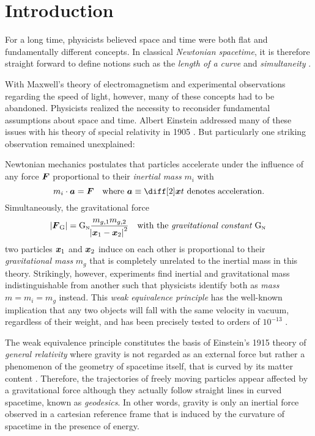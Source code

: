 \chapter{Introduction}\label{ch:intro}

For a long time, physicists believed space and time were both flat and fundamentally different concepts. In classical \emph{Newtonian spacetime}, it is therefore straight forward to define notions such as the \emph{length of a curve} and \emph{simultaneity} \autocite{Tolish}.

With Maxwell's theory of electromagnetism and experimental observations regarding the speed of light, however, many of these concepts had to be abandoned. Physicists realized the necessity to reconsider fundamental assumptions about space and time. Albert Einstein addressed many of these issues with his theory of special relativity in 1905 \autocite{Einstein1905}. But particularly one striking observation remained unexplained:

Newtonian mechanics postulates that particles accelerate under the influence of any force \(\boldsymbol{F}\) proportional to their \emph{inertial mass} \(m_i\) with \autocite{Newton1686}
\begin{equation}
	m_i \cdot \vect{a} = \vect{F} \quad \text{where \(\vect{a} \equiv \ddt{\vect{x}}\) denotes acceleration.}
\end{equation}
Simultaneously, the gravitational force
\begin{equation}
	\abs{\boldsymbol{F}_\textnormal{G}} = \mathrm{G}_\textnormal{\tiny{N}} \frac{m_{g,1}m_{g,2}}{\abs{\boldsymbol{x}_1-\boldsymbol{x}_2}^2} \quad \text{with the \emph{gravitational constant \(\mathrm{G}_\textnormal{\tiny{N}}\)}}
\end{equation}
two particles \(\boldsymbol{x}_1\) and \(\boldsymbol{x}_2\) induce on each other is proportional to their \emph{gravitational mass} \(m_g\) that is completely unrelated to the inertial mass in this theory. Strikingly, however, experiments find inertial and gravitational mass indistinguishable from another such that physicists identify both as \emph{mass} \(m=m_i=m_g\) instead. This \emph{weak equivalence principle} has the well-known implication that any two objects will fall with the same velocity in vacuum, regardless of their weight, and has been precisely tested to orders of \(10^{-13}\) \autocite{Adelberger2001,Wagner2012}.

The weak equivalence principle constitutes the basis of Einstein's 1915 theory of \emph{general relativity} where gravity is not regarded as an external force but rather a phenomenon of the geometry of spacetime itself, that is curved by its matter content \autocite{Einstein1915}. Therefore, the trajectories of freely moving particles appear affected by a gravitational force although they actually follow straight lines in curved spacetime, known as \emph{geodesics}. In other words, gravity is only an inertial force observed in a cartesian reference frame that is induced by the curvature of spacetime in the presence of energy.

